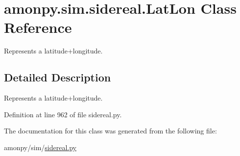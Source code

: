 \hypertarget{classamonpy_1_1sim_1_1sidereal_1_1_lat_lon}{\section{amonpy.\-sim.\-sidereal.\-Lat\-Lon Class Reference}
\label{classamonpy_1_1sim_1_1sidereal_1_1_lat_lon}
}


Represents a latitude+longitude.  




\subsection{Detailed Description}
Represents a latitude+longitude. 

Definition at line 962 of file sidereal.\-py.



The documentation for this class was generated from the following file\-:\begin{DoxyCompactItemize}
\item 
amonpy/sim/\hyperlink{sidereal_8py}{sidereal.\-py}\end{DoxyCompactItemize}
